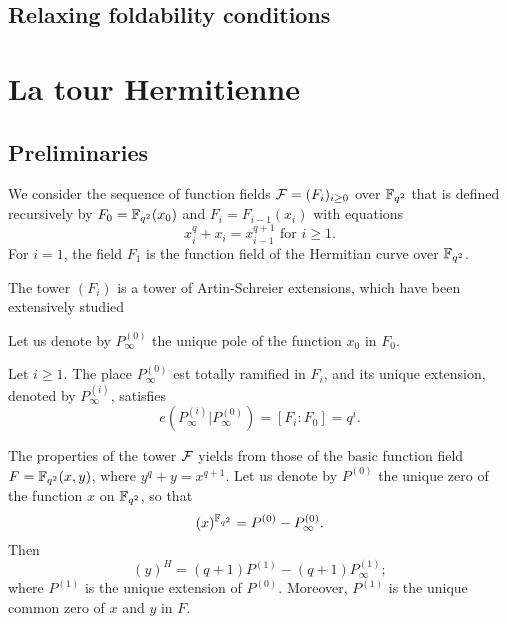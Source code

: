 \documentclass[10pt]{article}
\begin{document}
\subsection{Relaxing foldability conditions}



\section{La tour Hermitienne}

\subsection{Preliminaries}

 

We consider the sequence of function fields $\mathcal{F}=(F_i)_{i\geq 0}$ over $\mathbb{F}_{q^2}$ that is defined recursively by $F_0=\mathbb{F}_{q^2}(x_0)$ and $F_i = F_{i-1}(x_i)$ with equations
\[x_i^q+x_{i} = x_{i-1}^{q+1} \text{ for } i\geq 1.\]
For $i=1$, the field $F_1$ is the function field of the Hermitian curve over $\mathbb{F}_{q^2}$.

The tower $(F_i)$ is a tower of Artin-Schreier extensions, which have been extensively studied  

Let us denote by $P_{\infty}^{(0)}$ the unique pole of the function $x_0$ in $F_0$.

\begin{lemma}\cite[Proposition 3.7.8]{S08}
	Let $i \geq 1$. The place $P_{\infty}^{(0)}$ est totally ramified in $F_i$, and its unique extension, denoted by $P_{\infty}^{(i)}$, satisfies
\[e\left(P_{\infty}^{(i)}|P_{\infty}^{(0)}\right) = [F_i:F_0]=q^i.\]
\end{lemma}


The properties of the tower $\mathcal{F}$ yields from those of the basic function field $F=\mathbb{F}_{q^2}(x,y)$, where $y^q+y=x^{q+1}$. Let us denote by $P^{(0)}$ the unique zero of the function $x$ on $\mathbb{F}_{q^2}$, so that
\[(x)^{\mathbb{F}_{q^2}} = P^{(0)} - P^{(0)}_{\infty}.\]
Then
\[(y)^H = (q+1)P^{(1)} - (q+1)P^{(1)}_{\infty};\]
where $P^{(1)}$ is the unique extension of $P^{(0)}$. Moreover, $P^{(1)}$ is the unique common zero of $x$ and $y$ in $F$.
\end{document}

